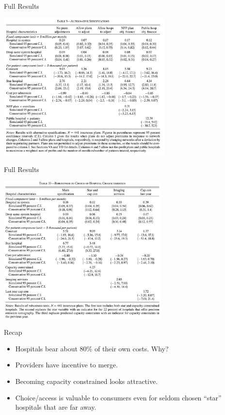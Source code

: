 \documentclass[xcolor=pdftex,dvipsnames,table,mathserif,aspectratio=169]{beamer}
\begin{document}
\begin{frame}{Full Results}
\begin{center}
\includegraphics[height=7.5cm]{./resources/ho_table9.png}
\end{center}
\end{frame}
\begin{frame}{Full Results}
\begin{center}
\includegraphics[height=7.5cm]{./resources/ho_table10.png}
\end{center}
\end{frame}

\begin{frame}{Recap}
\begin{itemize}
\item Hospitals bear about 80\% of their own costs. Why?
\item Providers have incentive to merge.
\item Becoming capacity constrained looks attractive.
\item Choice/access is valuable to consumers even for seldom chosen ``star'' hospitals that are far away.
\end{itemize}

\end{frame}
\end{document}
